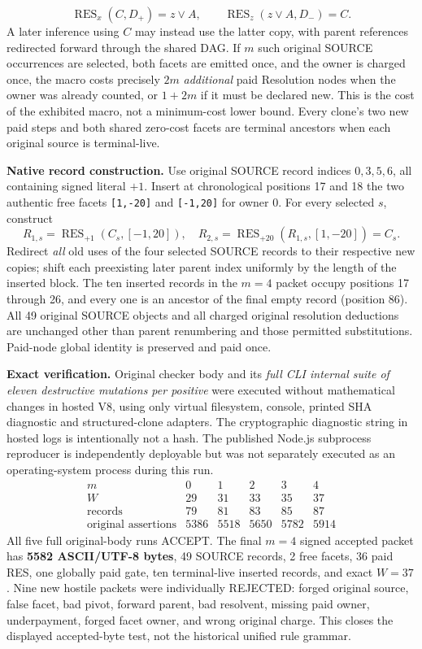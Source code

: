 \documentclass[11pt]{article}
\begin{document}
\[
\operatorname{RES}_{x}(C,D_+)=z\vee A,
\qquad
\operatorname{RES}_{z}(z\vee A,D_-)=C.
\]
A later inference using $C$ may instead use the latter copy, with parent references redirected forward through the shared DAG. If $m$ such original SOURCE occurrences are selected, both facets are emitted once, and the owner is charged once, the macro costs precisely $2m$ \emph{additional} paid Resolution nodes when the owner was already counted, or $1+2m$ if it must be declared new. This is the cost of the exhibited macro, not a minimum-cost lower bound. Every clone's two new paid steps and both shared zero-cost facets are terminal ancestors when each original source is terminal-live.
\par
\textbf{Native record construction.} Use original SOURCE record indices $0,3,5,6$, all containing signed literal $+1$. Insert at chronological positions 17 and 18 the two authentic free facets \texttt{[1,-20]} and \texttt{[-1,20]} for owner 0. For every selected $s$, construct
\[
R_{1,s}=\operatorname{RES}_{+1}(C_s,[-1,20]),\quad
R_{2,s}=\operatorname{RES}_{+20}(R_{1,s},[1,-20])=C_s.
\]
Redirect \emph{all} old uses of the four selected SOURCE records to their respective new copies; shift each preexisting later parent index uniformly by the length of the inserted block. The ten inserted records in the $m=4$ packet occupy positions 17 through 26, and every one is an ancestor of the final empty record (position 86). All 49 original SOURCE objects and all charged original resolution deductions are unchanged other than parent renumbering and those permitted substitutions. Paid-node global identity is preserved and paid once.
\par
\textbf{Exact verification.} Original checker body and its \emph{full CLI internal suite of eleven destructive mutations per positive} were executed without mathematical changes in hosted V8, using only virtual filesystem, console, printed SHA diagnostic and structured-clone adapters. The cryptographic diagnostic string in hosted logs is intentionally not a hash. The published Node.js subprocess reproducer is independently deployable but was not separately executed as an operating-system process during this run.
\[
\begin{array}{c|ccccc}
m&0&1&2&3&4\\\hline
W&29&31&33&35&37\\
\text{records}&79&81&83&85&87\\
\text{original assertions}&5386&5518&5650&5782&5914
\end{array}
\]
All five full original-body runs ACCEPT. The final $m=4$ signed accepted packet has \textbf{5582 ASCII/UTF-8 bytes}, 49 SOURCE records, 2 free facets, 36 paid RES, one globally paid gate, ten terminal-live inserted records, and exact $W=37$. Nine new hostile packets were individually REJECTED: forged original source, false facet, bad pivot, forward parent, bad resolvent, missing paid owner, underpayment, forged facet owner, and wrong original charge. This closes the displayed accepted-byte test, not the historical unified rule grammar.
\end{document}
